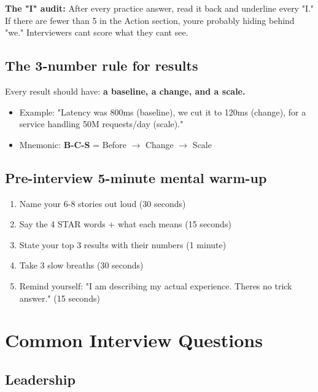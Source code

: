 \documentclass[11pt]{article}
\providecommand{\tightlist}{\setlength{\itemsep}{1pt}\setlength{\parskip}{0pt}}
\begin{document}
\textbf{The "I" audit:} After every practice answer, read it back and underline every "I." If there are fewer than 5 in the Action section, you\textquotesingle re probably hiding behind "we." Interviewers can\textquotesingle t score what they can\textquotesingle t see.

\subsection{The 3-number rule for results}\label{the-3-number-rule-for-results}

Every result should have: \textbf{a baseline, a change, and a scale.}

\begin{itemize}
\tightlist
\item
  Example: "Latency was 800ms (baseline), we cut it to 120ms (change), for a service handling 50M requests/day (scale)."
\item
  Mnemonic: \textbf{B-C-S} = Before \(\rightarrow\) Change \(\rightarrow\) Scale
\end{itemize}

\subsection{Pre-interview 5-minute mental warm-up}\label{pre-interview-5-minute-mental-warm-up}

\begin{enumerate}
\def\labelenumi{\arabic{enumi}.}
\tightlist
\item
  Name your 6-8 stories out loud (30 seconds)
\item
  Say the 4 STAR words + what each means (15 seconds)
\item
  State your top 3 results with their numbers (1 minute)
\item
  Take 3 slow breaths (30 seconds)
\item
  Remind yourself: "I am describing my actual experience. There\textquotesingle s no trick answer." (15 seconds)
\end{enumerate}

\section{Common Interview Questions}\label{common-interview-questions}

\subsection{Leadership}\label{leadership-1}
\end{document}

